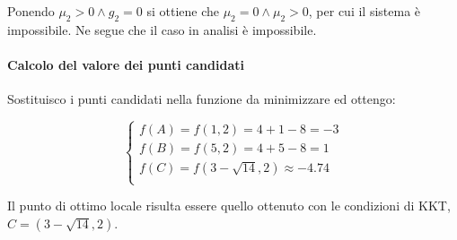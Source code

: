 \documentclass[\main/main.tex]{subfiles}
\begin{document}
Ponendo $\mu_2 > 0 \land g_2 = 0$ si ottiene che $\mu_2 = 0 \land \mu_2 > 0$, per cui il sistema è impossibile. Ne segue che il caso in analisi è impossibile.

\paragraph*{Calcolo del valore dei punti candidati}
Sostituisco i punti candidati nella funzione da minimizzare ed ottengo:

\[
	\begin{cases}
		f(A) = f(1,2) =  4 + 1 - 8 = -3          \\
		f(B) = f(5,2) =  4 + 5 - 8 = 1           \\
		f(C) = f(3 - \sqrt{14}, 2) \approx -4.74 \\
	\end{cases}
\]

Il punto di ottimo locale risulta essere quello ottenuto con le condizioni di KKT, $C = (3 - \sqrt{14}, 2)$.
\end{document}
